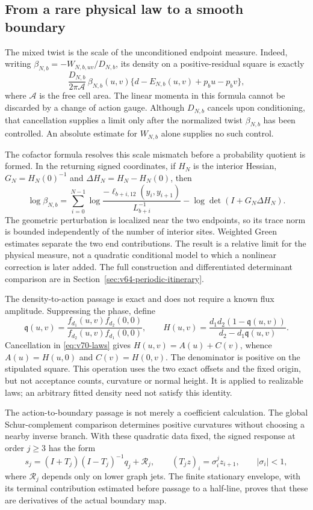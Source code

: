 \subsection{From a rare physical law to a smooth boundary}

The mixed twist is the scale of the unconditioned endpoint measure.
Indeed, writing $\beta_{N,b}=-W_{N,b,uv}/D_{N,b}$, its density on a
positive-residual square is exactly
\begin{equation}\label{eq:v70-physical-interface}
 \frac{D_{N,b}}{2\pi\mathcal A}\,
 \beta_{N,b}(u,v)\{d-E_{N,b}(u,v)+p_bu-p_bv\},
\end{equation}
where $\mathcal A$ is the free cell area.  The linear momenta in this
formula cannot be discarded by a change of action gauge.  Although
$D_{N,b}$ cancels upon conditioning, that cancellation supplies a limit
only after the normalized twist $\beta_{N,b}$ has been controlled.
An absolute estimate for $W_{N,b}$ alone supplies no such control.

The cofactor formula resolves this scale mismatch before a probability
quotient is formed.  In the returning signed coordinates, if $H_N$ is
the interior Hessian, $G_N=H_N(0)^{-1}$ and
$\Delta H_N=H_N-H_N(0)$, then
\[
 \log\beta_{N,b}
 =\sum_{i=0}^{N-1}\log
   \frac{-\ell_{b+i,12}(y_i,y_{i+1})}{L_{b+i}^{-1}}
       -\log\det(I+G_N\Delta H_N).
\]
The geometric perturbation is localized near the two endpoints, so its
trace norm is bounded independently of the number of interior sites.
Weighted Green estimates separate the two end contributions.  The
result is a relative limit for the physical measure, not a quadratic
conditional model to which a nonlinear correction is later added.
The full construction and differentiated determinant comparison are in
Section~\ref{sec:v64-periodic-itinerary}.

The density-to-action passage is exact and does not require a known
flux amplitude.  Suppressing the phase, define
\[
 \mathfrak q(u,v)=
 \frac{f_{d_1}(u,v)f_{d_2}(0,0)}
      {f_{d_2}(u,v)f_{d_1}(0,0)},\qquad
 H(u,v)=\frac{d_1d_2(1-\mathfrak q(u,v))}
                   {d_2-d_1\mathfrak q(u,v)}.
\]
Cancellation in \eqref{eq:v70-laws} gives
$H(u,v)=A(u)+C(v)$, whence $A(u)=H(u,0)$ and $C(v)=H(0,v)$.
The denominator is positive on the stipulated square.  This operation
uses the two exact offsets and the fixed origin, but not acceptance
counts, curvature or normal height.  It is applied to realizable laws;
an arbitrary fitted density need not satisfy this identity.

The action-to-boundary passage is not merely a coefficient calculation.
The global Schur-complement comparison determines positive curvatures
without choosing a nearby inverse branch.  With these quadratic data
fixed, the signed response at order $j\ge3$ has the form
\[
 s_j=(I+T_j)(I-T_j)^{-1}q_j+\mathcal R_j,
 \qquad (T_jz)_i=\sigma_i^jz_{i+1},\qquad |\sigma_i|<1,
\]
where $\mathcal R_j$ depends only on lower graph jets.
The finite stationary envelope, with its terminal contribution estimated
before passage to a half-line, proves that these are derivatives of the
actual boundary map.

